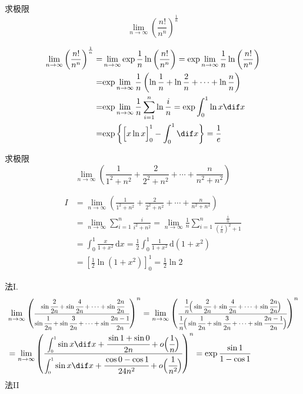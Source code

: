 \documentclass[color=green,titlestyle=hang]{elegantbook}%
\begin{document}
\begin{exercise}
求极限\begin{equation*}\lim_{n\to\infty}\left(\frac{n!}{n^n}\right)^{\frac{1}{n}}\end{equation*}
\end{exercise}
\begin{Solution}
\begin{align*}
\lim\limits_{n \to \infty } {\left( {\frac{{n!}}{{{n^n}}}} \right)^{\frac{1}{n}}} =& \lim\limits_{n \to \infty } {\exp{\frac{1}{n}\ln\left( {\frac{{n!}}{{{n^n}}}} \right)}}
= {\exp{\lim\limits_{n \to \infty } \frac{1}{n}\ln\left( {\frac{{n!}}{{{n^n}}}} \right)}}\\
= &{\exp{\lim\limits_{n \to \infty } \frac{1}{n}\left( {\ln\frac{1}{n} + \ln \frac{2}{n} +  \cdots  + \ln \frac{n}{n}} \right)}} \\
=& {\exp{\lim\limits_{n \to \infty } \frac{1}{n}\sum\limits_{i = 1}^n {\ln\frac{i}{n}} }}= {\displaystyle \exp{\int_0^1 {\ln x} \dif x}}\\
=&{\exp\bigg\{\Big[x\ln x\Big]_{0}^{1}-\int_0^1\dif x}\bigg\}=\frac{1}{e}
\end{align*}	
\end{Solution}

\begin{exercise}
求极限\begin{equation*}\lim_{n\to\infty}\left(\frac{1}{1^2+n^2}+\frac{2}{2^2+n^2}+\cdots+\frac{n}{n^2+n^2}\right)\end{equation*}
\end{exercise}\begin{Solution}
\begin{align*}I&=\lim_{n\to\infty}\left(\frac{1}{1^2+n^2}+\frac{2}{2^2+n^2}+\cdots+\frac{n}{n^2+n^2}\right)\\
&=\lim_{n\to\infty}\sum_{i=1}^{n}\frac{i}{i^2+n^2}=\lim_{n\to\infty}\frac{1}{n}\sum_{i=1}^{n}\frac{\frac{i}{n}}{\left(\frac{i}{n}\right)^2+1}\\
&=\int_{0}^{1}\frac{x}{1+x^2}\,\mathrm{d}x=\frac{1}{2}\int_{0}^{1}\frac{1}{1+x^2}\,\mathrm{d}(1+x^2)\\
&=\left[\frac{1}{2}\ln(1+x^2)\right]_{0}^{1}=\frac{1}{2}\ln2	
\end{align*}
\end{Solution}

法I. 
\begin{align*}
&\lim_{n\to \infty}\left(\scaleobj{0.8}{\cfrac{\sin\cfrac{2}{2n}+\sin\cfrac{4}{2n}+\cdots+\sin\cfrac{2n}{2n}}{\sin\cfrac{1}{2n}+\sin\cfrac{3}{2n}+\cdots+\sin\cfrac{2n-1}{2n}}}\right)^{n}
=\lim_{n\to \infty}\left(\scaleobj{0.8}{\cfrac{\cfrac{1}{n}\Big(\sin\cfrac{2}{2n}+\sin\cfrac{4}{2n}+\cdots+\sin\cfrac{2n}{2n}\Big)}{\cfrac{1}{n}\Big(\sin\cfrac{1}{2n}+\sin\cfrac{3}{2n}+\cdots+\sin\cfrac{2n-1}{2n}\Big)}}\right)^{n}\\
&=\lim_{n\to \infty}\left(\cfrac{\scaleobj{0.8}{\displaystyle\int_0^1}\sin x\dif x+\cfrac{\sin1+\sin0}{2n}+o\Big(\cfrac{1}{n}\Big)}{\scaleobj{0.8}{\displaystyle\int_0^1}\sin x\dif x+\cfrac{\cos0-\cos1}{24n^2}+o\Big(\cfrac{1}{n^2}\Big)}\right)^{n}=\exp\frac{\sin1}{1-\cos1}
\end{align*}
法II
\end{document}
